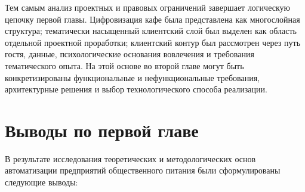 Тем самым анализ проектных и правовых ограничений завершает логическую цепочку первой главы. Цифровизация кафе была представлена как многослойная структура; тематически насыщенный клиентский слой был выделен как область отдельной проектной проработки; клиентский контур был рассмотрен через путь гостя, данные, психологические основания вовлечения и требования тематического опыта. На этой основе во второй главе могут быть конкретизированы функциональные и нефункциональные требования, архитектурные решения и выбор технологического способа реализации.

\section{Выводы по первой главе}

В результате исследования теоретических и методологических основ автоматизации предприятий общественного питания были сформулированы следующие выводы:

